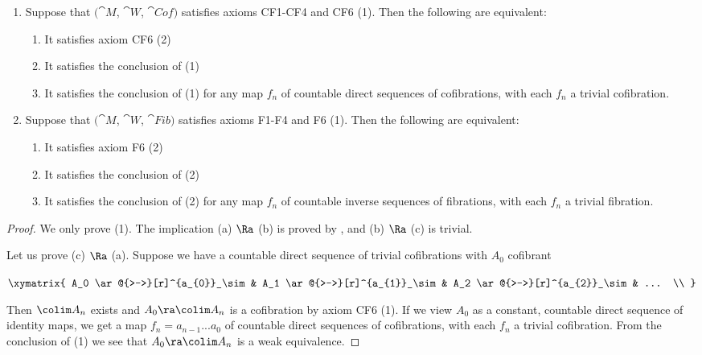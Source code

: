 \begin{lem}
\label{lem:equivformaxiomcf6}
\mbox{}
\begin{enumerate}
\item
Suppose that $({\cat M}$, ${\cat W}$, ${\cat Cof})$ satisfies axioms CF1-CF4 and CF6 (1). Then the following are equivalent:
\begin{enumerate}
\item
It satisfies axiom CF6 (2)
\item
It satisfies the conclusion of  (1)
\item
It satisfies the conclusion of  (1) for any map $f_n$ of countable direct sequences of cofibrations, with each $f_n$ a trivial cofibration.
\end{enumerate}
\item
Suppose that $({\cat M}$, ${\cat W}$, ${\cat Fib})$ satisfies axioms F1-F4 and F6 (1). Then the following are equivalent:
\begin{enumerate}
\item
It satisfies axiom F6 (2)
\item
It satisfies the conclusion of  (2)
\item
It satisfies the conclusion of  (2) for any map $f_n$ of countable inverse sequences of fibrations, with each $f_n$ a trivial fibration.
\end{enumerate}
\end{enumerate}
\end{lem}

\begin{proof}
We only prove (1). The implication (a) $\Ra$ (b) is proved by , and (b) $\Ra$ (c) is trivial. 

Let us prove (c) $\Ra$ (a). Suppose we have a countable direct sequence of trivial cofibrations with $A_0$ cofibrant
\begin{center}
$ \xymatrix {
        A_0 \ar@{>->}[r]^{a_{0}}_\sim &
        A_1 \ar@{>->}[r]^{a_{1}}_\sim &
        A_2 \ar@{>->}[r]^{a_{2}}_\sim &
	... \\
	}$
\end{center}
Then $\colim A_n$ exists and $A_0 \ra \colim A_n$ is a cofibration by axiom CF6 (1). If we view $A_0$ as a constant, countable direct sequence of identity maps, we get a map $f_n = a_{n-1} ... a_0$ of countable direct sequences of cofibrations, with each $f_n$ a trivial cofibration. From the conclusion of  (1) we see that $A_0 \ra \colim A_n$ is a weak equivalence.
\end{proof}

